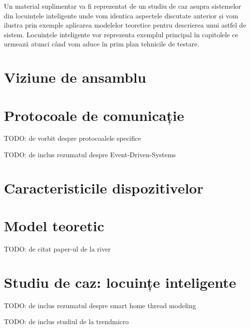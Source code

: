 Un material suplimentar va fi reprezentat de un studiu de caz asupra sistemelor din locuințele inteligente unde vom identica aspectele discutate anterior și vom ilustra prin exemple aplicarea modelelor teoretice pentru descrierea unui astfel de sistem. Locuințele inteligente vor reprezenta exemplul principal în capitolele ce urmează atunci când vom aduce în prim plan tehnicile de testare.

\section{Viziune de ansamblu}



\section{Protocoale de comunicație}

TODO: de vorbit despre protocoalele specifice

TODO: de inclus rezumatul despre Event-Driven-Systems

\section{Caracteristicile dispozitivelor}

\section{Model teoretic}

TODO: de citat paper-ul de la river


\section{Studiu de caz: locuințe inteligente}

TODO: de inclus rezumatul despre smart home thread modeling

TODO: de inclus studiul de la trendmicro